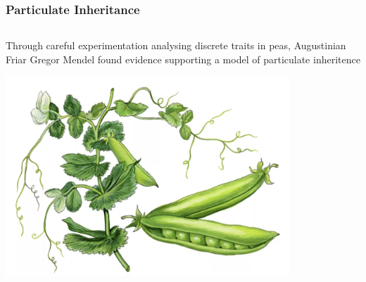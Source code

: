 \documentclass{beamer}
\begin{document}
\begin{frame}
	
	\frametitle{Particulate Inheritance}
	
	\begin{columns}[T]
		
		\begin{column}{0.6\textwidth}
			
			Through careful experimentation analysing discrete traits in peas, Augustinian Friar Gregor Mendel found evidence supporting a model of particulate inheritence
			
			\vspace{10pt}
			
			\includegraphics[keepaspectratio, width  =0.8\textwidth]{img/peas}


\end{column}
\end{columns}
\end{frame}
\end{document}
